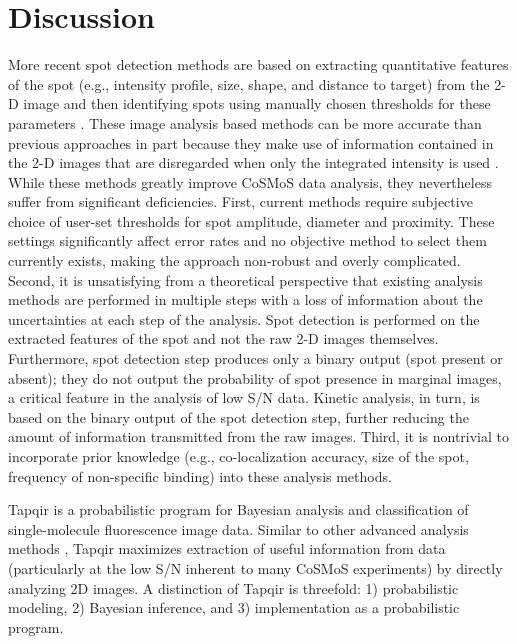 \section*{Discussion}

More recent spot detection methods are based on extracting quantitative features of the spot (e.g., intensity profile, size, shape, and distance to target) from the 2-D image and then identifying spots using manually chosen thresholds for these parameters \cite{Friedman2015-nx, Smith2019-yb}. These image analysis based methods can be more accurate than previous approaches in part because they make use of information contained in the 2-D images that are disregarded when only the integrated intensity is used \cite{Friedman2015-nx}. While these methods greatly improve CoSMoS data analysis, they nevertheless suffer from significant deficiencies. First, current methods require subjective choice of user-set thresholds for spot amplitude, diameter and proximity. These settings significantly affect error rates and no objective method to select them currently exists, making the approach non-robust and overly complicated. Second, it is unsatisfying from a theoretical perspective that existing analysis methods are performed in multiple steps with a loss of information about the uncertainties at each step of the analysis. Spot detection is performed on the extracted features of the spot and not the raw 2-D images themselves. Furthermore, spot detection step produces only a binary output (spot present or absent); they do not output the probability of spot presence in marginal images, a critical feature in the analysis of low S/N data. Kinetic analysis, in turn, is based on the binary output of the spot detection step, further reducing the amount of information transmitted from the raw images. Third, it is nontrivial to incorporate prior knowledge (e.g., co-localization accuracy, size of the spot, frequency of non-specific binding) into these analysis methods.

Tapqir is a probabilistic program for Bayesian analysis and classification of single-molecule fluorescence image data. Similar to other advanced analysis methods \cite{Friedman2015-nx,Smith2019-yb}, Tapqir maximizes extraction of useful information from data (particularly at the low S/N inherent to many CoSMoS experiments) by directly analyzing 2D images. A distinction of Tapqir is threefold: 1) probabilistic modeling, 2) Bayesian inference, and 3) implementation as a probabilistic program.


